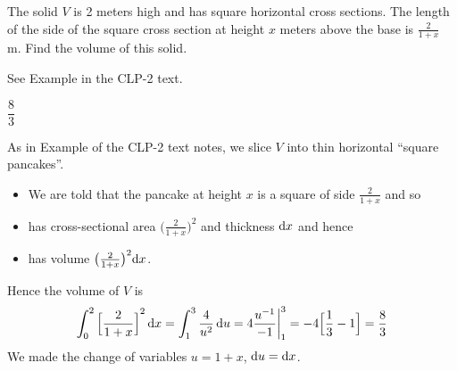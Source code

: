 \begin{solution}
\end{solution}


\begin{Mquestion}[1997D] %
The solid $V$ is 2 meters high and has square horizontal
cross sections. The length of the side of the square cross section at height
$x$ meters above the base is $\frac{2}{1+x}$ m. Find the volume
of this solid.
\end{Mquestion}

\begin{hint}
See Example  in the
CLP-2 text.
\end{hint}

\begin{answer}
$\dfrac{8}{3}$
\end{answer}

\begin{solution}
As in Example  of the
CLP-2 text notes, we slice $V$  into thin horizontal ``square pancakes''.

\begin{itemize}
\item We are told that the pancake at height $x$ is a square
of side $\frac{2}{1+x}$ and so
\item has cross-sectional area $\big(\frac{2}{1+x}\big)^2$ and
thickness $\mathrm{d}x$ and hence
\item has volume $\big(\frac{2}{1+x}\big)^2\mathrm{d}x$.
\end{itemize}
\noindent Hence the volume of $V$ is
$$
\int_0^2{\Big[\frac{2}{1+x}\Big]}^2\,\mathrm{d}x
=\int_1^3\frac{4}{u^2}\,\mathrm{d}u
=4\frac{u^{-1}}{-1}\bigg|_1^3
=-4\Big[\frac{1}{3}-1\Big]
=\frac{8}{3}
$$
We made the change of variables $u=1+x$, $\mathrm{d}u=\mathrm{d}x$.
\end{solution}

